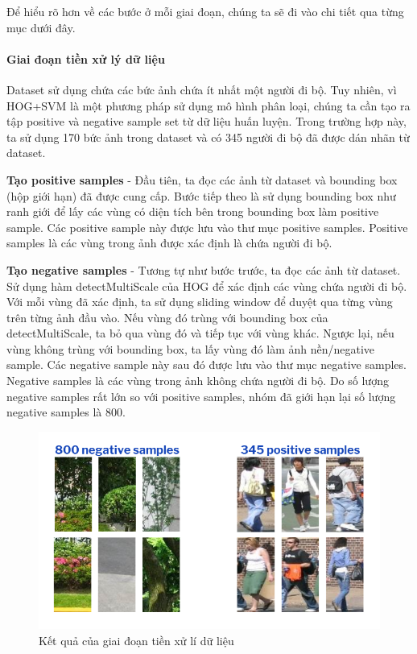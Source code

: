 Để hiểu rõ hơn về các bước ở mỗi giai đoạn, chúng ta sẽ đi vào chi tiết qua từng mục dưới đây.
\paragraph{Giai đoạn tiền xử lý dữ liệu\\}
Dataset sử dụng chứa các bức ảnh chứa ít nhất một người đi bộ. Tuy nhiên, vì HOG+SVM là một phương pháp sử dụng mô hình phân loại, chúng ta cần tạo ra tập positive và negative sample set từ dữ liệu huấn luyện. Trong trường hợp này, ta sử dụng 170 bức ảnh trong dataset và có 345 người đi bộ đã được dán nhãn từ dataset.

\textbf{Tạo positive samples} - Đầu tiên, ta đọc các ảnh từ dataset và bounding box (hộp giới hạn) đã được cung cấp. Bước tiếp theo là sử dụng bounding box như ranh giới để lấy các vùng có diện tích bên trong bounding box làm positive sample. Các positive sample này được lưu vào thư mục positive samples. Positive samples là các vùng trong ảnh được xác định là chứa người đi bộ.

\textbf{Tạo negative samples} - Tương tự như bước trước, ta đọc các ảnh từ dataset. Sử dụng hàm detectMultiScale của HOG để xác định các vùng chứa người đi bộ. Với mỗi vùng đã xác định, ta sử dụng sliding window để duyệt qua từng vùng trên từng ảnh đầu vào. Nếu vùng đó trùng với bounding box của detectMultiScale, ta bỏ qua vùng đó và tiếp tục với vùng khác. Ngược lại, nếu vùng không trùng với bounding box, ta lấy vùng đó làm ảnh nền/negative sample. Các negative sample này sau đó được lưu vào thư mục negative samples. Negative samples là các vùng trong ảnh không chứa người đi bộ. Do số lượng negative samples rất lớn so với positive samples, nhóm đã giới hạn lại số lượng negative samples là 800.

\graphicspath{{figures/}}
\begin{figure}[h!]
  \centering
  \includegraphics[scale=0.5]{graphics/data-prep.png}
  \caption{Kết quả của giai đoạn tiền xử lí dữ liệu}
\end{figure}

